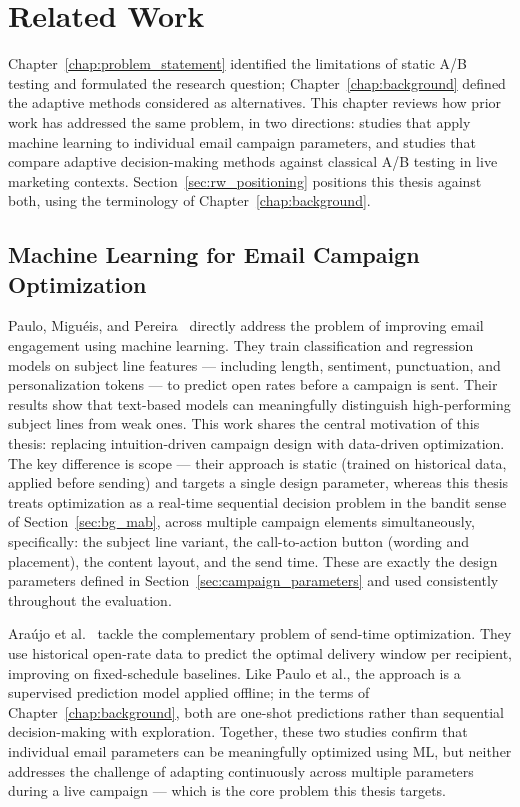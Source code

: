 \chapter{Related Work}
\label{chap:related_work}

Chapter~\ref{chap:problem_statement} identified the limitations of static A/B testing and formulated the research question; Chapter~\ref{chap:background} defined the adaptive methods considered as alternatives. This chapter reviews how prior work has addressed the same problem, in two directions: studies that apply machine learning to individual email campaign parameters, and studies that compare adaptive decision-making methods against classical A/B testing in live marketing contexts. Section~\ref{sec:rw_positioning} positions this thesis against both, using the terminology of Chapter~\ref{chap:background}.

\section{Machine Learning for Email Campaign Optimization}

Paulo, Miguéis, and Pereira~\cite{paulo2022leveraging} directly address the problem of improving email engagement using machine learning. They train classification and regression models on subject line features --- including length, sentiment, punctuation, and personalization tokens --- to predict open rates before a campaign is sent. Their results show that text-based models can meaningfully distinguish high-performing subject lines from weak ones. This work shares the central motivation of this thesis: replacing intuition-driven campaign design with data-driven optimization. The key difference is scope --- their approach is static (trained on historical data, applied before sending) and targets a single design parameter, whereas this thesis treats optimization as a real-time sequential decision problem in the bandit sense of Section~\ref{sec:bg_mab}, across multiple campaign elements simultaneously, specifically: the subject line variant, the call-to-action button (wording and placement), the content layout, and the send time. These are exactly the design parameters defined in Section~\ref{sec:campaign_parameters} and used consistently throughout the evaluation.

Araújo et al.~\cite{araujo2022send} tackle the complementary problem of send-time optimization. They use historical open-rate data to predict the optimal delivery window per recipient, improving on fixed-schedule baselines. Like Paulo et al., the approach is a supervised prediction model applied offline; in the terms of Chapter~\ref{chap:background}, both are one-shot predictions rather than sequential decision-making with exploration. Together, these two studies confirm that individual email parameters can be meaningfully optimized using ML, but neither addresses the challenge of adapting continuously across multiple parameters during a live campaign --- which is the core problem this thesis targets.


